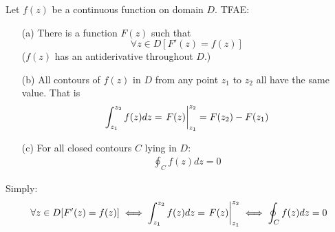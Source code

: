 \documentclass[12pt, english]{book}
\begin{document}
	\begin{theorem}
		 
		\label{Antiderivative and contour integrals theorem - Complex}
		Let \(f(z)\) be a continuous function on domain \(D\). TFAE:
		\begin{itemize}
			\item[(a)] There is a function \(F(z)\) such that 
			\[\forall z \in D [F'(z) = f(z)]\]
			(\(f(z)\) has an antiderivative throughout \(D\).)
			\item[(b)] All contours of \(f(z)\) in \(D\) from any point \(z_1\) to \(z_2\) all have the same value. That is 
			\begin{align*}
				\int_{z_1}^{z_2} f(z) dz = \eval{F(z)}_{z_1}^{z_2} = F(z_2) - F(z_1)
			\end{align*}
			\item[(c)] For all closed contours \(C\) lying in \(D\):
			\begin{align*}
				\oint_{C} f(z) dz = 0
			\end{align*}
		\end{itemize}
		Simply:
		\begin{align*}
			\forall z \in D [F'(z) = f(z)] 
			\iff \int_{z_1}^{z_2} f(z) dz = \eval{F(z)}_{z_1}^{z_2}
			\iff \oint_{C} f(z) dz = 0
		\end{align*}
	\end{theorem}
\end{document}
